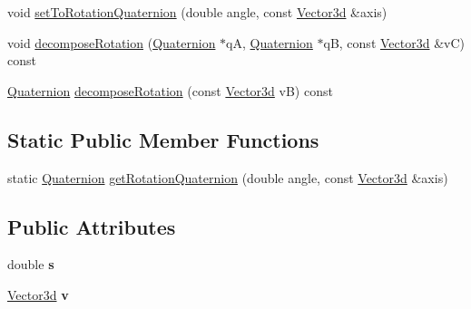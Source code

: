 \begin{DoxyCompactItemize}
\item 
void \hyperlink{classCartWheel_1_1Math_1_1Quaternion_afa92e61960b97934e37311e0f00a4822}{setToRotationQuaternion} (double angle, const \hyperlink{classCartWheel_1_1Math_1_1Vector3d}{Vector3d} \&axis)
\item 
void \hyperlink{classCartWheel_1_1Math_1_1Quaternion_ab5b687af1e88a900759cf931fa9dae8c}{decomposeRotation} (\hyperlink{classCartWheel_1_1Math_1_1Quaternion}{Quaternion} $\ast$qA, \hyperlink{classCartWheel_1_1Math_1_1Quaternion}{Quaternion} $\ast$qB, const \hyperlink{classCartWheel_1_1Math_1_1Vector3d}{Vector3d} \&vC) const 
\item 
\hyperlink{classCartWheel_1_1Math_1_1Quaternion}{Quaternion} \hyperlink{classCartWheel_1_1Math_1_1Quaternion_a6a8181b3bbf423b18a690563c98e294e}{decomposeRotation} (const \hyperlink{classCartWheel_1_1Math_1_1Vector3d}{Vector3d} vB) const 
\end{DoxyCompactItemize}
\subsection*{Static Public Member Functions}
\begin{DoxyCompactItemize}
\item 
static \hyperlink{classCartWheel_1_1Math_1_1Quaternion}{Quaternion} \hyperlink{classCartWheel_1_1Math_1_1Quaternion_a299b7739b1f6ea90edfe5d67c9008b0a}{getRotationQuaternion} (double angle, const \hyperlink{classCartWheel_1_1Math_1_1Vector3d}{Vector3d} \&axis)
\end{DoxyCompactItemize}
\subsection*{Public Attributes}
\begin{DoxyCompactItemize}
\item 
\hypertarget{classCartWheel_1_1Math_1_1Quaternion_a3e2c64342d378f8e7a44cc87e0ef82fa}{
double {\bfseries s}}
\label{classCartWheel_1_1Math_1_1Quaternion_a3e2c64342d378f8e7a44cc87e0ef82fa}

\item 
\hypertarget{classCartWheel_1_1Math_1_1Quaternion_ab55dd61157419bfaa35882b507c62f12}{
\hyperlink{classCartWheel_1_1Math_1_1Vector3d}{Vector3d} {\bfseries v}}
\label{classCartWheel_1_1Math_1_1Quaternion_ab55dd61157419bfaa35882b507c62f12}

\end{DoxyCompactItemize}


